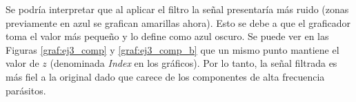 
		Se podría interpretar que al aplicar el filtro la señal presentaría más ruido (zonas previamente en azul se grafican amarillas ahora). Esto se debe a que el graficador toma el valor más pequeño y lo define como azul oscuro. Se puede ver en las Figuras \ref{graf:ej3_comp} y \ref{graf:ej3_comp_b} que un mismo punto mantiene el valor de $z$ (denominada \textit{Index} en los gráficos). Por lo tanto, la señal filtrada es más fiel a la original dado que carece de los componentes de alta frecuencia parásitos.

